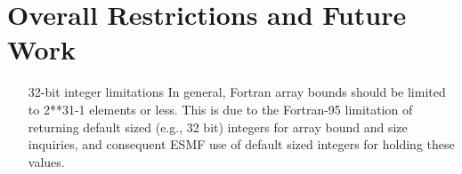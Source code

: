 
\section{Overall Restrictions and Future Work}
\label{sec:overallrest}

\begin{enumerate}

\item[32-bit integer limitations] In general, Fortran array bounds should
be limited to 2**31-1 elements or less.  This is due to the Fortran-95
limitation of returning default sized (e.g., 32 bit) integers for array bound
and size inquiries, and consequent ESMF use of default sized integers for
holding these values.

\end{enumerate}
